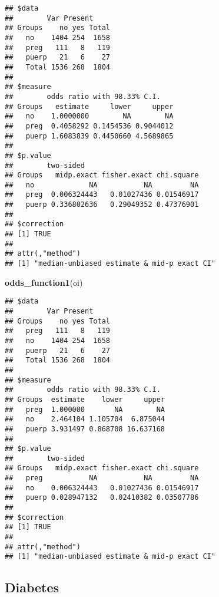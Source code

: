 \documentclass[
]{article}
\newenvironment{Shaded}{\begin{snugshade}}{\end{snugshade}}
\newcommand{\KeywordTok}[1]{\textcolor[rgb]{0.13,0.29,0.53}{\textbf{#1}}}
\newcommand{\NormalTok}[1]{#1}
\newcommand{\OperatorTok}[1]{\textcolor[rgb]{0.81,0.36,0.00}{\textbf{#1}}}
\newcommand{\StringTok}[1]{\textcolor[rgb]{0.31,0.60,0.02}{#1}}
\begin{document}
\begin{Shaded}
\end{Shaded}

\begin{verbatim}
## $data
##        Var Present
## Groups    no yes Total
##   no    1404 254  1658
##   preg   111   8   119
##   puerp   21   6    27
##   Total 1536 268  1804
## 
## $measure
##        odds ratio with 98.33% C.I.
## Groups   estimate     lower     upper
##   no    1.0000000        NA        NA
##   preg  0.4058292 0.1454536 0.9044012
##   puerp 1.6083839 0.4450660 4.5689865
## 
## $p.value
##        two-sided
## Groups   midp.exact fisher.exact chi.square
##   no             NA           NA         NA
##   preg  0.006324443   0.01027436 0.01546917
##   puerp 0.336802636   0.29049352 0.47376901
## 
## $correction
## [1] TRUE
## 
## attr(,"method")
## [1] "median-unbiased estimate & mid-p exact CI"
\end{verbatim}

\begin{Shaded}
\begin{Highlighting}[]
\KeywordTok{odds_function1}\NormalTok{(oi)}
\end{Highlighting}
\end{Shaded}

\begin{verbatim}
## $data
##        Var Present
## Groups    no yes Total
##   preg   111   8   119
##   no    1404 254  1658
##   puerp   21   6    27
##   Total 1536 268  1804
## 
## $measure
##        odds ratio with 98.33% C.I.
## Groups  estimate    lower     upper
##   preg  1.000000       NA        NA
##   no    2.464104 1.105704  6.875044
##   puerp 3.931497 0.868708 16.637168
## 
## $p.value
##        two-sided
## Groups   midp.exact fisher.exact chi.square
##   preg           NA           NA         NA
##   no    0.006324443   0.01027436 0.01546917
##   puerp 0.028947132   0.02410382 0.03507786
## 
## $correction
## [1] TRUE
## 
## attr(,"method")
## [1] "median-unbiased estimate & mid-p exact CI"
\end{verbatim}

\hypertarget{diabetes}{%
\subsection{Diabetes}\label{diabetes}}
\end{document}

